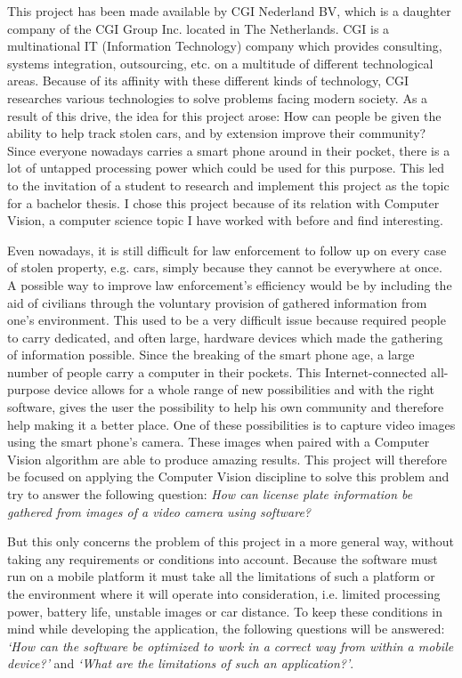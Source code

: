 
This project has been made available by CGI Nederland BV, which is a daughter company of the CGI Group Inc. located in The Netherlands. CGI is a multinational IT (Information Technology) company which provides consulting, systems integration, outsourcing, etc. on a multitude of different technological areas. Because of its affinity with these different kinds of technology, CGI researches various technologies to solve problems facing modern society. As a result of this drive, the idea for this project arose: How can people be given the ability to help track stolen cars, and by extension improve their community? Since everyone nowadays carries a smart phone around in their pocket, there is a lot of untapped processing power which could be used for this purpose. This led to the invitation of a student to research and implement this project as the topic for a bachelor thesis. I chose this project because of its relation with Computer Vision, a computer science topic I have worked with before and find interesting.


Even nowadays, it is still difficult for law enforcement to follow up on every case of stolen property, e.g. cars, simply because they cannot be everywhere at once. A possible way to improve law enforcement's efficiency would be by including the aid of civilians through the voluntary provision of gathered information from one's environment. This used to be a very difficult issue because required people to carry dedicated, and often large, hardware devices which made the gathering of information possible. Since the breaking of the smart phone age, a large number of people carry a computer in their pockets. This Internet-connected all-purpose device allows for a whole range of new possibilities and with the right software, gives the user the possibility to help his own community and therefore help making it a better place. One of these possibilities is to capture video images using the smart phone's camera. These images when paired with a Computer Vision algorithm are able to produce amazing results. This project will therefore be focused on applying the Computer Vision discipline to solve this problem and try to answer the following question: \textit{How can license plate information be gathered from images of a video camera using software?}

But this only concerns the problem of this project in a more general way, without taking any requirements or conditions into account. Because the software must run on a mobile platform it must take all the limitations of such a platform or the environment where it will operate into consideration, i.e. limited processing power, battery life, unstable images or car distance. To keep these conditions in mind while developing the application, the following questions will be answered: \textit{`How can the software be optimized to work in a correct way from within a mobile device?'} and \textit{`What are the limitations of such an application?'}.

